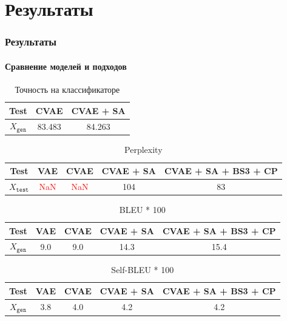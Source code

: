 \documentclass[10pt]{beamer}
\newcommand\NaN{\textcolor{red}{NaN}}
\begin{document}
\section{Результаты}
\begin{frame}
\frametitle{Результаты}
\framesubtitle{Сравнение моделей и подходов}

\begin{table}
\begin{tabular}{c | c c}
\toprule
\textbf{Test} & \textbf{CVAE} & \textbf{CVAE + SA} \\
\midrule
$X_{\texttt{gen}}$ & 83.483 & 84.263 \\
\bottomrule
\end{tabular}
\vskip-2mm
\caption{Точность на классификаторе}
\end{table}

\vskip-6mm

\begin{table}
\begin{tabular}{c | c c c c}
\toprule
\textbf{Test} & \textbf{VAE} & \textbf{CVAE} & \textbf{CVAE + SA} & \textbf{CVAE + SA + BS3 + CP} \\
\midrule
$X_{\texttt{test}}$ & \NaN & \NaN & 104 & 83 \\
\bottomrule
\end{tabular}
\vskip-2mm
\caption{Perplexity}
\end{table}

\vskip-6mm

\begin{table}
\begin{tabular}{c | c c c c}
\toprule
\textbf{Test} & \textbf{VAE} & \textbf{CVAE} & \textbf{CVAE + SA} & \textbf{CVAE + SA + BS3 + CP} \\
\midrule
$X_{\texttt{gen}}$ & 9.0 & 9.0 & 14.3 & 15.4 \\
\bottomrule
\end{tabular}
\vskip-2mm
\caption{BLEU * 100}
\end{table}

\vskip-6mm

\begin{table}
\begin{tabular}{c | c c c c}
\toprule
\textbf{Test} & \textbf{VAE} & \textbf{CVAE} & \textbf{CVAE + SA} & \textbf{CVAE + SA + BS3 + CP} \\
\midrule
$X_{\texttt{gen}}$ & 3.8 & 4.0 & 4.2 & 4.2 \\
\bottomrule
\end{tabular}
\vskip-2mm
\caption{Self-BLEU * 100}
\end{table}

\end{frame}
\end{document}

